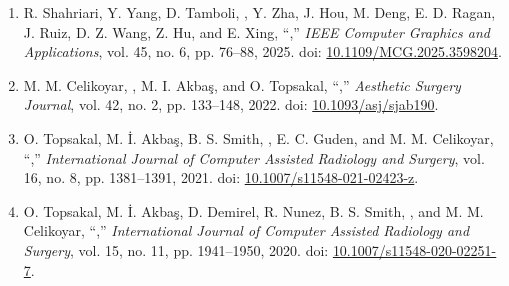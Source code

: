 \begin{enumerate}
\item R. Shahriari, Y. Yang, D. Tamboli, \me, Y. Zha, J. Hou, M. Deng, E. D. Ragan, J. Ruiz, D. Z. Wang, Z. Hu, and E. Xing, ``,'' \textit{IEEE Computer Graphics and Applications}, vol. 45, no. 6, pp. 76–88, 2025. doi: \href{https://doi.org/10.1109/MCG.2025.3598204}{10.1109/MCG.2025.3598204}.
\item M. M. Celikoyar, \me, M. I. Akbaş, and O. Topsakal, ``,'' \textit{Aesthetic Surgery Journal}, vol. 42, no. 2, pp. 133–148, 2022. doi: \href{https://doi.org/10.1093/asj/sjab190}{10.1093/asj/sjab190}.
\item O. Topsakal, M. İ. Akbaş, B. S. Smith, \me, E. C. Guden, and M. M. Celikoyar, ``,'' \textit{International Journal of Computer Assisted Radiology and Surgery}, vol. 16, no. 8, pp. 1381–1391, 2021. doi: \href{https://doi.org/10.1007/s11548-021-02423-z}{10.1007/s11548-021-02423-z}.
\item O. Topsakal, M. İ. Akbaş, D. Demirel, R. Nunez, B. S. Smith, \me, and M. M. Celikoyar, ``,'' \textit{International Journal of Computer Assisted Radiology and Surgery}, vol. 15, no. 11, pp. 1941–1950, 2020. doi: \href{https://doi.org/10.1007/s11548-020-02251-7}{10.1007/s11548-020-02251-7}.
\end{enumerate}
